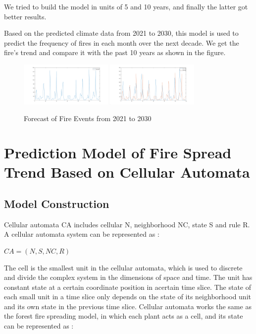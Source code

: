 \documentclass{mcmthesis}
\begin{document}
We tried to build the model in units of 5 and 10 years, and finally the latter got better results.

Based on the predicted climate data from 2021 to 2030, this model is used to predict the frequency of fires in each month over the next decade. We get the fire's trend and compare it with the past 10 years as shown in the figure.

\begin{figure}[H]
  \centering
  {
  \includegraphics[width=0.4\textwidth]{image/y_21_30.png} 
  }
  {
  \includegraphics[width=0.4\textwidth]{image/compare_10_10.png}
  }
  \caption{Forecast of Fire Events from 2021 to 2030 }
  \label{png1}
\end{figure}




\section{Prediction Model of Fire Spread Trend Based on Cellular Automata}

\subsection{Model Construction}

Cellular automata CA includes cellular N, neighborhood NC, state S and rule R. A cellular automata system can be represented as :
\begin{center}
$CA=(N,S,NC,R)$
\end{center}

The cell is the smallest unit in the cellular automata, which is used to discrete and divide the complex system in the dimensions of space and time. The unit has constant state at a certain coordinate position in acertain time slice. The state of each small unit in a time slice only depends on the state of its neighborhood unit and its own state in the previous time slice. Cellular automata works the same as the forest fire spreading model, in which each plant acts as a cell, and its state can be represented as :
\end{document}
